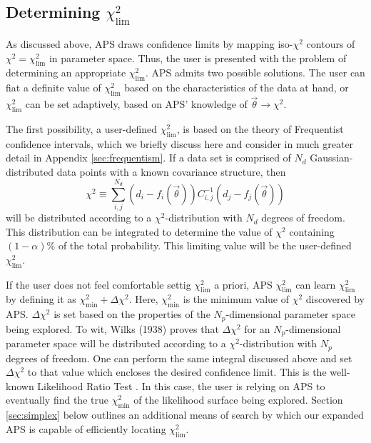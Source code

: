 \documentclass[useAMS,usenatbib]{aastex}
\begin{document}
\subsection{Determining $\chi^2_\text{lim}$}
\label{sec:chi}

As discussed above, APS draws confidence limits by mapping
iso-$\chi^2$ contours of $\chi^2=\chi^2_\text{lim}$ in parameter space.
Thus, the user is presented with the problem of determining an
appropriate $\chi^2_\text{lim}$.  APS admits two possible solutions.
The user can fiat a definite value of $\chi^2_\text{lim}$
based on the characteristics of the data at hand,
or $\chi^2_\text{lim}$ can be set adaptively, based on APS'
knowledge of $\vec{\theta}\rightarrow\chi^2$.

The first possibility, a user-defined $\chi^2_\text{lim}$, is based
on the theory of Frequentist confidence intervals, which we briefly discuss
here and consider in much greater detail in Appendix \ref{sec:frequentism}.
If a data set is comprised of $N_d$ Gaussian-distributed data points
with a known covariance structure, then 
\begin{equation}
\chi^2\equiv\sum_{i,j}^{N_d}(d_i-f_i(\vec{\theta}))C^{-1}_{i,j}
(d_j-f_j(\vec{\theta}))
\end{equation}
will be distributed according to a $\chi^2$-distribution with $N_d$ degrees
of freedom.  This distribution can be integrated to determine the value
of $\chi^2$ containing $(1-\alpha)\%$ of the total probability.  This limiting
value will be the user-defined $\chi^2_\text{lim}$.

If the user does not feel comfortable settig $\chi^2_\text{lim}$
a priori, APS $\chi^2_\text{lim}$ can learn $\chi^2_\text{lim}$ by
defining it as $\chi^2_\text{min}+\Delta\chi^2$.  Here, $\chi^2_\text{min}$
is the minimum value of $\chi^2$ discovered by APS.  
$\Delta \chi^2$ is set
based on the properties of the $N_p$-dimensional parameter space being explored.
To wit, Wilks (1938) proves that $\Delta\chi^2$ for an $N_p$-dimensional
parameter space will be distributed according to a $\chi^2$-distribution
with $N_p$ degrees of freedom.  One can perform the same integral discussed
above and set $\Delta\chi^2$ to that value which encloses the desired confidence
limit.  This is the well-known Likelihood Ratio Test \cite{np}.
In this case, the user is relying on APS to eventually find the true
$\chi^2_\text{min}$ of the likelihood surface being explored.  
Section \ref{sec:simplex} below outlines an additional means of search
by which our expanded APS is capable of efficiently locating $\chi^2_\text{lim}$.
\end{document}
